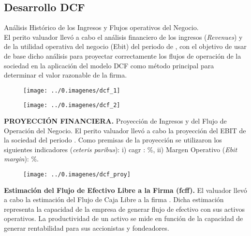 \subsection{Desarrollo DCF}

\textcolor{principal}{An\'alisis Hist\'orico de los Ingresos y Flujos operativos del Negocio.}\\

El perito valuador llev\'o a cabo el an\'alisis financiero de los ingresos (\textit{Revenues}) y de la utilidad operativa del negocio (Ebit) del periodo de \EFdeHasta, con el objetivo de usar de base dicho an\'alisis para proyectar correctamente los flujos de operaci\'on de la sociedad en la aplicaci\'on del modelo DCF como m\'etodo principal para determinar el valor razonable de la firma.

\begin{figure}[H]
\centering
\texttt{[image: ../0.imagenes/dcf\_1]}
\end{figure}

\begin{figure}[H]
\centering
\texttt{[image: ../0.imagenes/dcf\_2]}
\end{figure}


\textcolor{principal}{\textbf{PROYECCI\'ON FINANCIERA.} Proyecci\'on de Ingresos y del Flujo de Operaci\'on del Negocio.} El perito valuador llev\'o a cabo la proyecci\'on del EBIT de la sociedad del periodo \periodoProyeccion. Como premisas de la proyecci\'on se utilizaron los siguientes indicadores (\textit{ceteris paribus}): i) \gls{cagr} \periodoProyeccion: \proyCagr\%, ii) Margen Operativo (\textit{Ebit margin}): \proyEbitMargin\%.

\begin{figure}[H]
\centering
\texttt{[image: ../0.imagenes/dcf\_proy]}
\end{figure}

\textbf{\textcolor{principal}{Estimaci\'on del Flujo de Efectivo Libre a la Firma (\gls{fcff}).}} El valuador llev\'o a cabo la estimaci\'on del Flujo de Caja Libre a la firma
. Dicha estimaci\'on representa la capacidad de la empresa de generar flujo de efectivo con sus activos operativos. La productividad de un activo se mide en funci\'on de la capacidad de generar rentabilidad para sus accionistas y fondeadores.\\

